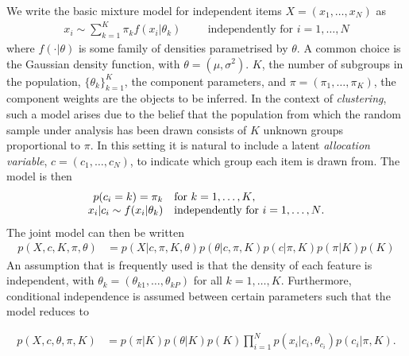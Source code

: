 \documentclass{bioinfo}
\begin{document}
We write the basic mixture model for independent items $X=(x_1, \ldots, x_N)$ as 
\begin{align}
x_i \sim \sum_{k=1}^K\pi_k f(x_i | \theta_k) \hspace{1cm} \textrm{independently for $i = 1,\ldots,N$}
\end{align}
where $f(\cdot| \theta)$ is some family of densities parametrised by $\theta$. A common choice is the Gaussian density function, with $\theta=(\mu, \sigma^2)$. $K$, the number of subgroups in the population, $\{\theta_k\}_{k=1}^K$, the component parameters, and $\pi=(\pi_1, \ldots, \pi_K)$, the component weights are the objects to be inferred. In the context of \emph{clustering}, such a model arises due to the belief that the population from which the random sample under analysis has been drawn consists of $K$ unknown groups proportional to $\pi$. In this setting it is natural to include a latent \emph{allocation variable}, $c=(c_1, \ldots, c_N)$, to indicate which group each item is drawn from. The model is then
\begin{equation}
	\label{eqn:mixModel}
	\begin{array}{r@{}l l}
		p(c_i = k) = \pi_k&  &\textrm{for $k = 1,\ldots,K$,} \\
		x_i | c_i \sim f(x_i | \theta_k)& &\textrm{independently for $i = 1,\ldots,N$.} 
	\end{array}
\end{equation}
The joint model can then be written
\begin{align}
	p(X, c, K, \pi, \theta) &= p(X | c, \pi, K, \theta) p(\theta | c, \pi, K) p(c | \pi, K) p(\pi | K) p(K) \nonumber
\end{align}
An assumption that is frequently used is that the density of each feature is independent, with $\theta_k=(\theta_{k1},\ldots, \theta_{kP})$ for all $k=1,\ldots,K$. Furthermore, conditional independence is assumed between certain parameters such that the model reduces to

\begin{align}
	p(X, c, \theta, \pi, K) &=  p(\pi | K) p(\theta | K) p(K) \prod_{i=1}^N p(x_i | c_i, \theta_{c_i}) p (c_i | \pi, K).  \label{eqn:jointMixModel}
\end{align}
\end{document}
